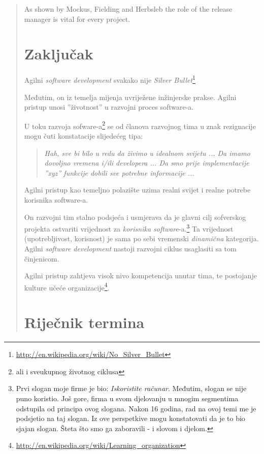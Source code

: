 \documentclass[lmodern, utf8, zavrsni]{fit}
\begin{document}
\begin{quote}
As shown by Mockus, Fielding and Herbsleb the role of the release manager is vital for every project.\citep[str. 95]{Siegel2012}

\chapter{Zaključak}

Agilni \emph{software development} svakako nije \emph{Silver Bullet}\footnote{\url{http://en.wikipedia.org/wiki/No_Silver_Bullet}}

Međutim, on iz temelja mijenja uvriježene inžinjerske prakse. Agilni pristup unosi ''životnost'' u razvojni proces software-a.

U toku razvoja sofware-a\footnote{ali i sveukupnog životnog ciklusa} se od članova razvojnog tima u znak rezignacije mogu čuti konstatacije slijedećeg tipa:
\begin{quotation}
  \emph{Hah, sve bi bilo u redu da živimo u idealnom svijetu ... Da imamo dovoljno vremena i/ili developera ... Da smo prije implementacije ''xyz'' funkcije dobili sve potrebne informacije ...}
\end{quotation}

Agilni pristup kao temeljno polazište uzima realni svijet i realne potrebe korisnika software-a.

On razvojni tim stalno podsjeća i usmjerava da je glavni cilj sofverskog projekta ostvariti vrijednost za \emph{korisnika software}-a.\footnote{Prvi slogan moje firme je bio: \emph{Iskoristite računar}. Međutim, slogan se nije puno koristio. Još gore, firma u svom djelovanju u mnogim segmentima odstupila od principa ovog slogana. Nakon 16 godina, rad na ovoj temi me je podsjetio na taj slogan. Iz ove perspetkive mogu konstatovati da je to bio sjajan slogan. Šteta što smo ga zaboravili - i slovom i djelom.}
Ta vrijednost (upotrebljivost, korisnost) je sama po sebi vremenski \emph{dinamična} kategorija. Agilni \emph{software development} nastoji razvojni ciklus usaglasiti sa tom činjenicom.

Agilni pristup zahtjeva visok nivo kompetencija unutar tima, te postojanje kulture učeće organizacije\footnote{\url{http://en.wikipedia.org/wiki/Learning_organization}}.





\appendix

\chapter{Riječnik termina}


\end{quote}
\end{document}

